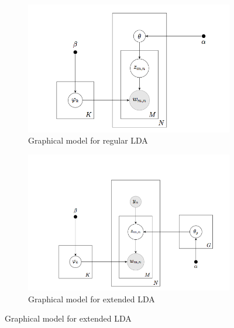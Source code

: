 \begin{figure}[htp]
	\centering
	\begin{subfigure}[b]{0.5\textwidth}
		\includegraphics[width=\textwidth]{regular_lda_img}
		\caption{Graphical model for regular LDA}
		\label{fig:graphical-model}
	\end{subfigure}%
        \begin{subfigure}[b]{0.5\textwidth}
		\includegraphics[width=\textwidth]{extended_lda_img}
		\caption{Graphical model for extended LDA}
		\label{fig:graphical-model_extended}
	\end{subfigure}
\end{figure}



